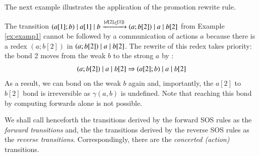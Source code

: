 The next example illustrates the application of the promotion rewrite rule.
\begin{example}\label{example4}
{\rm The transition 
$(a[1];b) \; \vert \; a[1] \; \vert \;  b \xrightarrow{\{d[2], \underline{c}[1]\}} (a;b[2])\; \vert \; a \; \vert \; b[2]$ 
from Example \ref{ex:examp1} cannot be followed by a communication of actions $a$ because there
is a  redex $(a;b[2])$ in $(a;b[2])\; \vert \; a \; \vert \; b[2]$. The rewrite of this redex takes 
priority: the bond 2 moves from the weak $b$ to the strong $a$ by :
$$(a;b[2])\; \vert \; a \; \vert \; b[2] \Rightarrow (a[2];b)\; \vert \; a \; \vert \; b[2] $$
As a result, we can bond on the weak $b$ again and, importantly, the $a[2]$ to $b[2]$ bond is irreversible
as $\gamma(a,b)$ is undefined. Note that reaching
this bond by computing forwards alone is not possible.}
\end{example}

We shall call henceforth the transitions derived by the forward SOS rules as the \emph{forward transitions} 
and, the the transitions derived by the reverse SOS rules as the \emph{reverse transitions}.
Correspondingly, there are the \emph{concerted (action)} transitions. 


